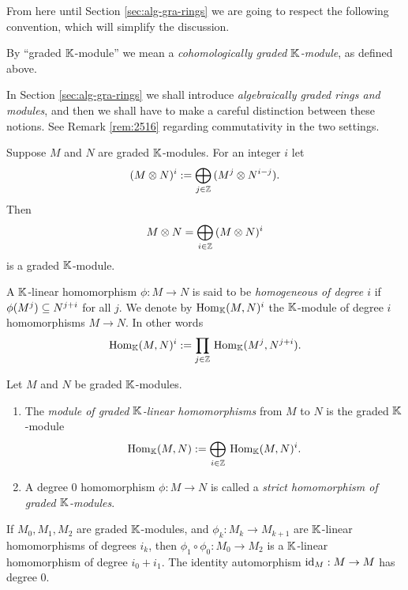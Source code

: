 From here until Section \ref{sec:alg-gra-rings} we are going to respect the 
following convention, which will simplify the discussion. 

\begin{conv} \label{conv:4125}
By ``graded $\mathbb{K}$-module'' we mean a {\em cohomologically graded $\mathbb{K}$-module}, 
as defined above.
\end{conv}

In Section \ref{sec:alg-gra-rings} we shall introduce {\em algebraically graded 
rings and modules}, and then we shall have to make a careful distinction 
between these notions. See Remark \ref{rem:2516} regarding commutativity in the 
two settings. 

Suppose $M$ and $N$ are graded $\mathbb{K}$-modules. For an integer $i$ let 
\[ (M \otimes N)^i := \bigoplus_{j \in \mathbb{Z}} \, (M^j \otimes N^{i - j}) . \]
Then 
\begin{equation} \label{eqn:1691}
M \otimes N = \bigoplus_{i \in \mathbb{Z}} \, (M \otimes N)^i  
\end{equation}
is a graded $\mathbb{K}$-module. 

A $\mathbb{K}$-linear homomorphism $\phi : M \to N$ is said to be {\em homogeneous of  
degree $i$} if $\phi(M^j) \subseteq N^{j + i}$ for all $j$. 
We denote by $\operatorname{Hom}_{\mathbb{K}}(M, N)^i$ the $\mathbb{K}$-module of degree $i$ 
homomorphisms $M \to N$. In other words 
\begin{equation} \label{eqn:4120}
\operatorname{Hom}_{\mathbb{K}}(M, N)^i := \prod_{j \in \mathbb{Z}} \, 
\operatorname{Hom}_{\mathbb{K}}(M^j, N^{j + i}) .
\end{equation}

\begin{dfn} \label{dfn:4120}
Let $M$ and $N$ be graded $\mathbb{K}$-modules.
\begin{enumerate}
\item The {\em module of graded $\mathbb{K}$-linear homomorphisms} from $M$ to $N$ is 
the graded $\mathbb{K}$-module
\[ \operatorname{Hom}_{\mathbb{K}}(M, N) := \bigoplus_{i \in \mathbb{Z}} \,
\operatorname{Hom}_{\mathbb{K}}(M, N)^i  . \]

\item A  degree $0$ homomorphism $\phi : M \to N$ is called a 
{\em strict homomorphism of graded $\mathbb{K}$-modules}.%
\end{enumerate}
\end{dfn}

If $M_0, M_1, M_2$ are graded $\mathbb{K}$-modules, and 
$\phi_k : M_{k} \to M_{k + 1}$ are $\mathbb{K}$-linear homomorphisms of degrees 
$i_k$, then $\phi_1 \circ \phi_0 : M_0 \to M_2$
is a $\mathbb{K}$-linear homomorphism of degree $i_0 + i_1$. 
The identity automorphism $\operatorname{id}_M : M \to M$ has degree $0$. 

